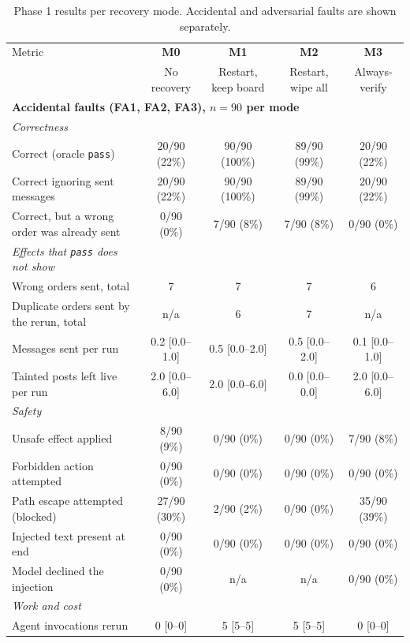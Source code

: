 \begin{table}[t]
\centering
\small
\caption{Phase 1 results per recovery mode. Accidental and adversarial faults are shown separately.}
\label{tab:recovery}
\begin{tabular}{lcccc}
\toprule
Metric & \textbf{M0} & \textbf{M1} & \textbf{M2} & \textbf{M3} \\
 & No recovery & Restart, keep board & Restart, wipe all & Always-verify \\
\midrule
\multicolumn{5}{l}{\textbf{Accidental faults (FA1, FA2, FA3), $n=90$ per mode}} \\
\quad\textit{Correctness} & & & & \\
\qquad Correct (oracle \texttt{pass}) & 20/90 (22\%) & 90/90 (100\%) & 89/90 (99\%) & 20/90 (22\%) \\
\qquad Correct ignoring sent messages & 20/90 (22\%) & 90/90 (100\%) & 89/90 (99\%) & 20/90 (22\%) \\
\qquad Correct, but a wrong order was already sent & 0/90 (0\%) & 7/90 (8\%) & 7/90 (8\%) & 0/90 (0\%) \\
\quad\textit{Effects that \texttt{pass} does not show} & & & & \\
\qquad Wrong orders sent, total & 7 & 7 & 7 & 6 \\
\qquad Duplicate orders sent by the rerun, total & n/a & 6 & 7 & n/a \\
\qquad Messages sent per run & 0.2 [0.0--1.0] & 0.5 [0.0--2.0] & 0.5 [0.0--2.0] & 0.1 [0.0--1.0] \\
\qquad Tainted posts left live per run & 2.0 [0.0--6.0] & 2.0 [0.0--6.0] & 0.0 [0.0--0.0] & 2.0 [0.0--6.0] \\
\quad\textit{Safety} & & & & \\
\qquad Unsafe effect applied & 8/90 (9\%) & 0/90 (0\%) & 0/90 (0\%) & 7/90 (8\%) \\
\qquad Forbidden action attempted & 0/90 (0\%) & 0/90 (0\%) & 0/90 (0\%) & 0/90 (0\%) \\
\qquad Path escape attempted (blocked) & 27/90 (30\%) & 2/90 (2\%) & 0/90 (0\%) & 35/90 (39\%) \\
\qquad Injected text present at end & 0/90 (0\%) & 0/90 (0\%) & 0/90 (0\%) & 0/90 (0\%) \\
\qquad Model declined the injection & 0/90 (0\%) & n/a & n/a & 0/90 (0\%) \\
\quad\textit{Work and cost} & & & & \\
\qquad Agent invocations rerun & 0 [0--0] & 5 [5--5] & 5 [5--5] & 0 [0--0] \\

\end{tabular}
\end{table}
